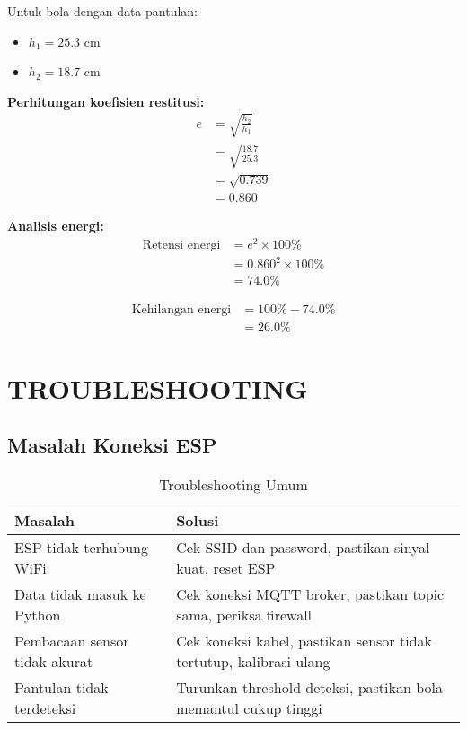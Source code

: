\documentclass[12pt,a4paper]{article}
\begin{document}
Untuk bola dengan data pantulan:
\begin{itemize}
    \item $h_1 = 25.3$ cm
    \item $h_2 = 18.7$ cm
\end{itemize}

\textbf{Perhitungan koefisien restitusi:}
\begin{align}
e &= \sqrt{\frac{h_2}{h_1}} \\
&= \sqrt{\frac{18.7}{25.3}} \\
&= \sqrt{0.739} \\
&= 0.860
\end{align}

\textbf{Analisis energi:}
\begin{align}
\text{Retensi energi} &= e^2 \times 100\% \\
&= 0.860^2 \times 100\% \\
&= 74.0\%
\end{align}

\begin{align}
\text{Kehilangan energi} &= 100\% - 74.0\% \\
&= 26.0\%
\end{align}

\section{TROUBLESHOOTING}

\subsection{Masalah Koneksi ESP}
\begin{table}[H]
\centering
\begin{tabular}{|p{5cm}|p{8cm}|}
\hline
\textbf{Masalah} & \textbf{Solusi} \\
\hline
ESP tidak terhubung WiFi & Cek SSID dan password, pastikan sinyal kuat, reset ESP \\
\hline
Data tidak masuk ke Python & Cek koneksi MQTT broker, pastikan topic sama, periksa firewall \\
\hline
Pembacaan sensor tidak akurat & Cek koneksi kabel, pastikan sensor tidak tertutup, kalibrasi ulang \\
\hline
Pantulan tidak terdeteksi & Turunkan threshold deteksi, pastikan bola memantul cukup tinggi \\
\hline
\end{tabular}
\caption{Troubleshooting Umum}
\end{table}
\end{document}

